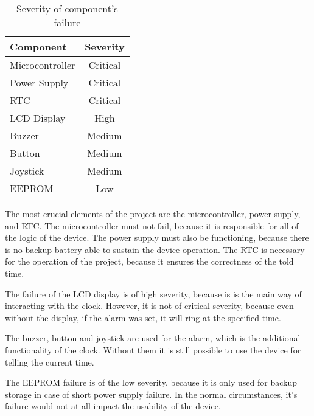 \documentclass[10pt]{article}
\begin{document}
\begin{table}[H]\centering
	\newcommand{\critical}{\color{red} Critical}
	\begin{tabular}{|l|c|}
		\hline
		\bf Component   & \bf Severity           \\\hline
		Microcontroller & \critical              \\\hline
		Power Supply    & \critical\footnotemark \\\hline
		RTC             & \critical              \\\hline
		LCD Display     & High                   \\\hline
		Buzzer          & Medium                 \\\hline
		Button          & Medium                 \\\hline
		Joystick        & Medium                 \\\hline
		EEPROM          & Low                    \\\hline
	\end{tabular}
	\caption{Severity of component's failure}
\end{table}

The most crucial elements of the project are the microcontroller, power supply, and RTC.
The microcontroller must not fail, because it is responsible for all of the logic of the device.
The power supply must also be functioning, because there is no backup battery able to sustain the device operation.
The RTC is necessary for the operation of the project, because it ensures the correctness of the told time.

The failure of the LCD display is of high severity, because is is the main way of interacting with the clock.
However, it is not of critical severity, because even without the display, if the alarm was set, it will ring at the specified time.

The buzzer, button and joystick are used for the alarm, which is the additional functionality of the clock.
Without them it is still possible to use the device for telling the current time.

The EEPROM failure is of the low severity, because it is only used for backup storage in case of short power supply failure.
In the normal circumstances, it's failure would not at all impact the usability of the device.
\end{document}
